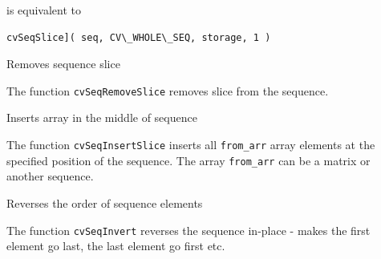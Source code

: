 is equivalent to

\begin{lstlisting}
cvSeqSlice]( seq, CV\_WHOLE\_SEQ, storage, 1 )
\end{lstlisting}

\label{SeqRemoveSlice}

Removes sequence slice


\begin{description}
\end{description}


The function \texttt{cvSeqRemoveSlice} removes slice from the sequence.

\label{SeqInsertSlice}

Inserts array in the middle of sequence


\begin{description}
\end{description}


The function \texttt{cvSeqInsertSlice} inserts all \texttt{from\_arr}
array elements at the specified position of the sequence. The array
\texttt{from\_arr} can be a matrix or another sequence.

\label{SeqInvert}

Reverses the order of sequence elements


\begin{description}
\end{description}


The function \texttt{cvSeqInvert} reverses the sequence in-place - makes the first element go last, the last element go first etc.


